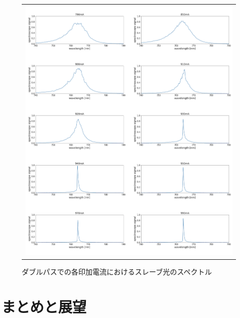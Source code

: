 \documentclass[uplatex, dvipdfmx, a4paper, report, papersize, 11pt]{jsbook}
\begin{document}
\begin{figure}[htpb]
\begin{tabular}{c}
      \begin{minipage}{1\hsize}
        \centering
          \includegraphics[keepaspectratio,  scale=0.340,  angle=0]
                          {figures/chapter4/double-pass-Slave-Spectrum.png}
                          \caption{ダブルパスでの各印加電流におけるスレーブ光のスペクトル}
                          \label{double-pass_I-Slave}

      \end{minipage}


    \end{tabular}
\end{figure}



\chapter{まとめと展望}




\end{document}
